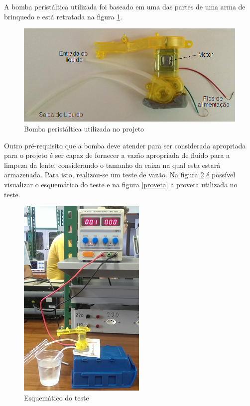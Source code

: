 A bomba peristáltica utilizada foi baseado em uma das partes de uma arma de brinquedo e está retratada na figura \ref{bomba}.

\begin{figure}[H]
		\centering
			\includegraphics[scale=1.0]{figuras/bomba.png}
		\caption{Bomba peristáltica utilizada no projeto}
		\label{bomba}
\end{figure}

Outro pré-requisito que a bomba deve atender para ser considerada apropriada para o projeto é ser capaz de fornecer a vazão apropriada de fluido para a limpeza da lente, considerando o tamanho da caixa na qual esta estará armazenada. Para isto, realizou-se um teste de vazão. Na figura \ref{esquematico} é possível visualizar o esquemático do teste e na figura \ref{proveta} a proveta utilizada no teste.

\begin{figure}[H]
		\centering
			\includegraphics[scale=1.0]{figuras/esquematico.png}
		\caption{Esquemático do teste}
		\label{esquematico}
\end{figure}


